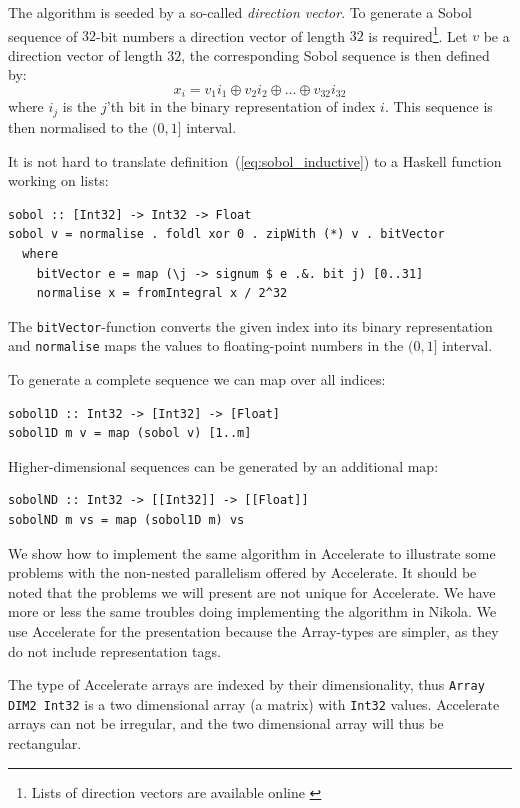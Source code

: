 \documentclass{llncs2e/llncs}
\begin{document}
The algorithm is seeded by a so-called \emph{direction vector}. To
generate a Sobol sequence of $32$-bit numbers a direction vector of
length $32$ is required\footnote{Lists of direction vectors are
  available online \cite{homepage:sobol:directionvectors}}. Let $v$ be
a direction vector of length $32$, the corresponding Sobol sequence is
then defined by:
\begin{equation}
x_i = v_1i_1 \oplus v_2i_2 \oplus \ldots \oplus v_{32}i_{32}\label{eq:sobol_inductive}
\end{equation}
where $i_j$ is the $j$'th bit in the binary representation of index
$i$. This sequence is then normalised to the $(0,1]$ interval.

It is not hard to translate definition~(\ref{eq:sobol_inductive}) to a
Haskell function working on lists:
\begin{verbatim}
sobol :: [Int32] -> Int32 -> Float
sobol v = normalise . foldl xor 0 . zipWith (*) v . bitVector
  where
    bitVector e = map (\j -> signum $ e .&. bit j) [0..31]
    normalise x = fromIntegral x / 2^32
\end{verbatim}
The \verb|bitVector|-function converts the given index into its binary
representation and \verb|normalise| maps the values to floating-point
numbers in the $(0,1]$ interval.

To generate a complete sequence we can map over all indices:
\begin{verbatim}
sobol1D :: Int32 -> [Int32] -> [Float]
sobol1D m v = map (sobol v) [1..m]
\end{verbatim}
Higher-dimensional sequences can be generated by an additional map:
\begin{verbatim}
sobolND :: Int32 -> [[Int32]] -> [[Float]]
sobolND m vs = map (sobol1D m) vs
\end{verbatim}

We show how to implement the same algorithm in Accelerate to
illustrate some problems with the non-nested parallelism offered by
Accelerate. It should be noted that the problems we will present are
not unique for Accelerate. We have more or less the same troubles
doing implementing the algorithm in Nikola. We use Accelerate for the
presentation because the Array-types are simpler, as they do not
include representation tags.

The type of Accelerate arrays are indexed by their dimensionality,
thus \verb|Array DIM2 Int32| is a two dimensional array (a matrix) with
\verb|Int32| values. Accelerate arrays can not be irregular, and the
two dimensional array will thus be rectangular.
\end{document}

